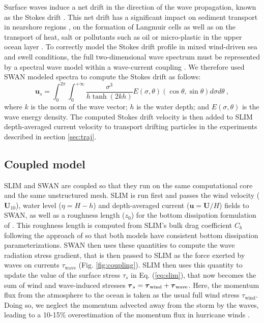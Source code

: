 Surface waves induce a net drift in the direction of the wave propagation, known as the Stokes drift \citep{van2018stokes,stokes1880theory}. This net drift has a significant impact on sediment transport in nearshore regions \citep{hoefel2003wave}, on the formation of Langmuir cells \citep{langmuir1938surface, craik1976rational} as well as on the transport of heat, salt or pollutants such as oil or micro-plastic in the upper ocean layer \citep{mcwilliams2000vertical,rohrs2012observation,drivdal2014wave}. To correctly model the Stokes drift profile in mixed wind-driven sea and swell conditions, the full two-dimensional wave spectrum must be represented by a spectral wave model within a wave-current coupling \citep{van2018stokes}. We therefore used SWAN modeled spectra to compute the Stokes drift as follows:
\begin{equation}
    \mathbf{u}_{s} = \int_0^{2\pi}\int_0^{+\infty} \dfrac{\sigma^3}{h\tanh(2kh)}E(\sigma,\theta)(\cos\theta, \sin\theta)d\sigma d\theta~, \label{eq:stokes}
\end{equation}
where $k$ is the norm of the wave vector; $h$ is the water depth; and $E(\sigma,\theta)$ is the wave energy density. The computed Stokes drift velocity is then added to SLIM depth-averaged current velocity to transport drifting particles in the experiments described in section \ref{sec:traj}.

\subsection{Coupled model}

SLIM and SWAN are coupled so that they run on the same computational core and the same unstructured mesh. SLIM is run first and passes the wind velocity ($\mathbf{U}_{10}$), water level ($\eta=H-h$) and depth-averaged current ($\mathbf{u}=\mathbf{U}/H$) fields to SWAN, as well as a roughness length ($z_0$) for the bottom dissipation formulation of \cite{madsen1989spectral}. This roughness length is computed from SLIM's bulk drag coefficient $C_b$ following the approach of \cite{dietrich2011hurricane} so that both models have consistent bottom dissipation parameterizations. SWAN then uses these quantities to compute the wave radiation stress gradient, that is then passed to SLIM as the force exerted by waves on currents {\boldmath$\tau$}$_\text{wave}$ (Fig. \ref{fig:coupling}). SLIM then uses this quantity to update the value of the surface stress {\boldmath$\tau$}$_s$ in Eq. (\ref{eq:slim}), that now becomes the sum of wind and wave-induced stresses $\text{\boldmath$\tau$}_s = \text{\boldmath$\tau$}_\text{wind}+\text{\boldmath$\tau$}_\text{wave}$. Here, the momentum flux from the atmosphere to the ocean is taken as the usual full wind stress {\boldmath$\tau$}$_\text{wind}$. Doing so, we neglect the momentum advected away from the storm by the waves, leading to a 10-15\% overestimation of the momentum flux in hurricane winds \citep{curcic2015explicit}.

